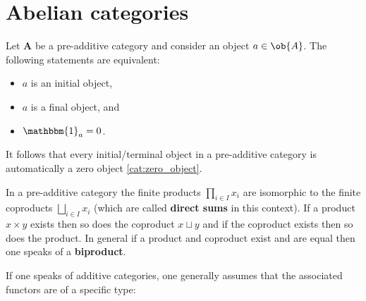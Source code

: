 \section{Abelian categories}\label{section:abelian_categories}


    \begin{property}
        Let $\mathbf{A}$ be a pre-additive category and consider an object $a\in\ob{A}$. The following statements are equivalent:
        \begin{itemize}
            \item $a$ is an initial object,
            \item $a$ is a final object, and
            \item $\mathbbm{1}_a = 0$.
        \end{itemize}
        It follows that every initial/terminal object in a pre-additive category is automatically a zero object \ref{cat:zero_object}.
    \end{property}
    \begin{property}[Biproducts]
        In a pre-additive category the finite products $\prod_{i\in I}x_i$ are isomorphic to the finite coproducts $\bigsqcup_{i\in I} x_i$ (which are called \textbf{direct sums} in this context). If a product $x\times y$ exists then so does the coproduct $x\sqcup y$ and if the coproduct exists then so does the product. In general if a product and coproduct exist and are equal then one speaks of a \textbf{biproduct}.
    \end{property}


    If one speaks of additive categories, one generally assumes that the associated functors are of a specific type:

